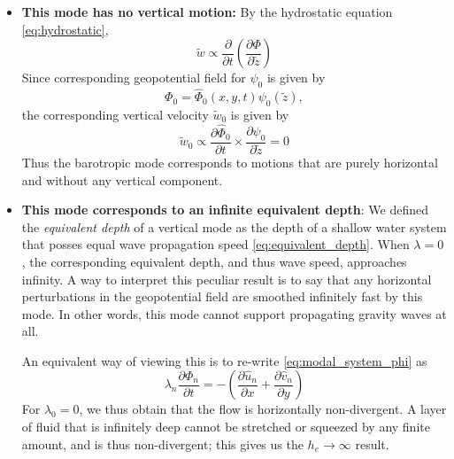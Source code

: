 \documentclass{article}
\numberwithin{equation}{section}
\newcommand{\w}{\tilde{w}}
\newcommand{\z}{\tilde{z}}
\begin{document}
\begin{itemize}
\item \textbf{This mode has no vertical motion:} By the hydrostatic equation \eqref{eq:hydrostatic}, 
\begin{equation}
  \w \propto \frac{\partial}{\partial t}\left(\frac{\partial\Phi}{\partial \z}\right)
\end{equation}
Since corresponding geopotential field for $\psi_0$  is given by 
\begin{equation}
\Phi_0=\hat\Phi_0(x,y,t)\psi_0(\z),
\end{equation}
the corresponding vertical velocity $\w_0$ is given by
\begin{equation}
  \w_0\propto\frac{\partial\hat\Phi_0}{\partial t}\times\frac{\partial\psi_0}{\partial\z}=0
\end{equation}
Thus the barotropic mode corresponds to motions that are purely horizontal and without any vertical component.
\item \textbf{This mode corresponds to an infinite equivalent depth}: We defined the \textit{equivalent depth} of a vertical mode as the depth of a shallow water system that posses equal wave propagation speed \eqref{eq:equivalent_depth}. When $\lambda=0$, the corresponding equivalent depth, and thus wave speed, approaches infinity. A way to interpret this peculiar result is to say that any horizontal perturbations in the geopotential field are smoothed infinitely fast by this mode. In other words, this mode cannot support propagating gravity waves at all. 
\par An equivalent way of viewing this is to re-write \eqref{eq:modal_system_phi} as 
\begin{equation}
  \lambda_n\frac{\partial\Phi_n}{\partial t} = -\left(\frac{\partial \hat u_n}{\partial x} + \frac{\partial \hat v_n}{\partial y}\right)
\end{equation}
For $\lambda_0=0$, we thus obtain that the flow is horizontally non-divergent. A layer of fluid that is infinitely deep cannot be stretched or squeezed by any finite amount, and is thus non-divergent; this gives us the $h_e\to\infty$ result.
\end{itemize}
\end{document}
